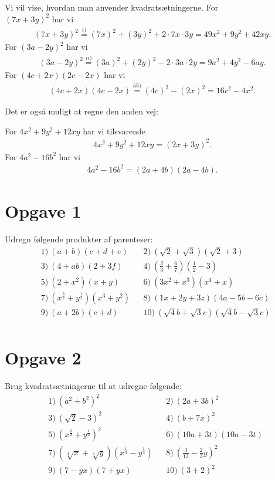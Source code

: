 \begin{exa}
Vi vil vise, hvordan man anvender kvadratsætningerne. For \\$(7x+3y)^2$ har vi
\begin{align*}
(7x+3y)^2 \overset{i)}{=} (7x)^2+(3y)^2+2\cdot 7x\cdot 3y = 49x^2+9y^2+42xy.
\end{align*}
For $(3a-2y)^2$ har vi
\begin{align*}
(3a-2y)^2 \overset{ii)}{=} (3a)^2+(2y)^2 -2\cdot 3a\cdot 2y = 9a^2 + 4y^2-6ay.
\end{align*}
For $(4c+2x)(2c-2x)$ har vi
\begin{align*}
(4c+2x)(4c-2x) \overset{iii)}{=} (4c)^2-(2x)^2 = 16c^2-4x^2.
\end{align*}
\end{exa}
Det er også muligt at regne den anden vej:
\begin{exa}
For $4x^2+9y^2+12xy$ har vi tilsvarende
\begin{align*}
4x^2+9y^2+12xy = (2x+3y)^2.
\end{align*}
For $4a^2-16b^2$ har vi
\begin{align*}
   4a^2-16b^2 = (2a+4b)(2a-4b).
\end{align*}
\end{exa}
\section*{Opgave 1}
Udregn følgende produkter af parenteser:
\begin{align*}
&1) \ (a+b)(c+d+e)  &&2) \ (\sqrt{2}+\sqrt{3})(\sqrt{2}+3)  \\
 &3) \ (4+ab)(2+3f)   &&4) \ (\frac{2}{3} + \frac{6}{7})(\frac{1}{2} - 3)  \\
 &5) \ (2+x^2)(x+y)  &&6) \ (3x^2+x^3)(x^4+x)  \\
 &7) \ (x^{\frac{3}{2}}+y^{\frac{1}{2}})(x^{3}+y^2)  &&8) \ (1x+2y+3z)(4a-5b-6c)  \\
 &9) \ (a+2b)(c+d)   &&10) \ (\sqrt{4}b+\sqrt{3}c)(\sqrt{4}b-\sqrt{3}c)  \\
\end{align*}
\section*{Opgave 2}
Brug kvadratsætningerne til at udregne følgende:
\begin{align*}
&1)  \ (a^2+b^2)^2  &&2) \  (2a+3b)^2 \\
&3) \ (\sqrt{2}-3)^2  &&4) \  (b+7x)^2 \\
&5) \ (x^{\frac{1}{2}}+y^{\frac{1}{2}})^2   &&6) \ (10a+3t)(10a-3t)   \\
&7) \ (\sqrt[3]{x}+\sqrt[3]{y})(x^{\frac{1}{3}}-y^{\frac{1}{3}})  &&8) \ (\frac{3}{13}-\frac{2}{3}y)^2  \\
&9) \ (7-yx)(7+yx)   &&10) \ (3+2)^2   \\
\end{align*}
